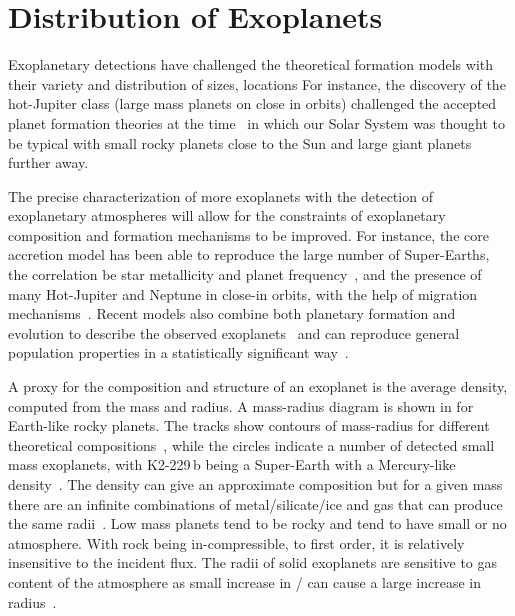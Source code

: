 
\section{Distribution of Exoplanets}

Exoplanetary detections have challenged the theoretical formation models with their variety and distribution of sizes, locations For instance, the discovery of the hot-Jupiter class (large mass planets on close in orbits) challenged the accepted planet formation theories at the time~\citep[.e.g][]{pollack_formation_1996, boss_giant_1997} in which our Solar System was thought to be typical with small rocky planets close to the Sun and large giant planets further away.


The precise characterization of more exoplanets with the detection of exoplanetary atmospheres will allow for the constraints of exoplanetary composition and formation mechanisms to be improved.
For instance, the core accretion model has been able to reproduce the large number of Super-Earths, the correlation be star metallicity and planet frequency~\citep[e.g.][]{santos_spectroscopic_2004, fischer_planetmetallicity_2005}, and the presence of many Hot-Jupiter and Neptune in close-in orbits, with the help of migration mechanisms~\citep[e.g.][]{Triaud_exoplanets_2016}.
Recent models also combine both planetary formation and evolution to describe the observed exoplanets~\citep[e.g.][]{mordasini_characterization_2012} and can reproduce general population properties in a statistically significant way~\citep{mordasini_characterization_2009}.

A proxy for the composition and structure of an exoplanet is the average density, computed from the mass and radius.
A mass-radius diagram is shown in  for Earth-like rocky planets.
The tracks show contours of mass-radius for different theoretical compositions~\citep{brugger_constraints_2017}, while the circles indicate a number of detected small mass exoplanets, with {K2-229\,b} being a Super-Earth with a Mercury-like density~\cite{santerne_earthsized_2018}.
The density can give an approximate composition but for a given mass there are an infinite combinations of metal/silicate/ice and gas that can produce the same radii~\citep[e.g.][]{seager_massradius_2007}.
Low mass planets tend to be rocky and tend to have small or no atmosphere. With rock being in-compressible, to first order, it is relatively insensitive to the incident flux.
The radii of solid exoplanets are sensitive to gas content of the atmosphere as small increase in / can cause a large increase in radius~\citep{adams_ocean_2008}.

